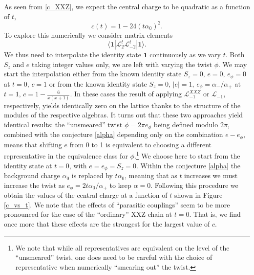 \documentclass[a4paper,10pt]{article}
\newcommand{\linnea}[1]{$\framebox{\tiny L}$\ \textbf{\texttt{{\color{red}\footnotesize#1}}}}
\newcommand{\KSgen}{\mathcal{L}}
\begin{document}
As seen from \ref{c_XXZ}, we expect the central charge to be quadratic as a function of $t$, %
\begin{equation}
c(t)=1- 24 (t\alpha_0)^2.
\end{equation}
%
To explore this numerically we consider matrix elements 
\begin{equation}
\langle \mathbf{1}|\KSgen^t_{2} \KSgen^t_{-2}|\mathbf{1}\rangle.
\end{equation}
We thus need to interpolate the identity state $\mathbf{1}$ continuously as we vary $t$. Both $S_z$ and $e$ taking integer values only, we are left with varying the twist $\phi$. We may start the interpolation either from the known identity state $S_z=0,\,e=0,\,e_\phi=0$ at $t=0,\, c=1$ or from the known identity state $S_z=0,\,|e|=1,\,e_\phi=\alpha_-/\alpha_+$ at $t=1,\,c=1-\frac{6}{x(x+1)}$. In these cases the result of applying $\KSgen_{-1}^{XXZ}$ or $\KSgen_{-1}$, respectively, yields identically zero on the lattice thanks to the structure of the modules of the respective algebras. %
It turns out that these two approaches yield identical results: the ``unsmeared'' twist $\phi=2\pi e_\phi$ being defined modulo $2\pi$, combined with the conjecture \eqref{alpha} depending only on the combination $e-e_\phi$, means that shifting $e$ from 0 to 1 is equivalent to choosing a different representative in the equivalence class for $\phi$.\footnote{We note that while all representatives are equivalent on the level of the ``unsmeared'' twist, one does need to be careful with the choice of representative when numerically ``smearing out'' the twist.} 
We choose here to start from the identity state at $t=0$, with $e=e_\phi=S_z=0$. Within the conjecture \eqref{alpha} the background charge $\alpha_0$ is replaced by $t\alpha_0$, meaning that as $t$ increases we must increase the twist as $e_\phi = 2t\alpha_0/\alpha_+$ to keep $\alpha=0$. Following this procedure we obtain the values of the central charge at a function of $t$ shown in Figure \ref{c_vs_t}. We note that the effects of ``parasitic couplings'' seem to be more pronounced for the case of the ``ordinary'' XXZ chain at $t=0$. That is, we find once more that these effects are the strongest for the largest value of $c$. 
\end{document}
